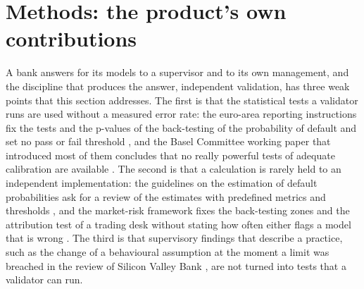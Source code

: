 \providecommand{\pxfn}[1]{\nolinkurl{#1}}

\section{Methods: the product's own contributions}
\label{sec:proposed}

A bank answers for its models to a supervisor and to its own management, and the discipline that produces the answer, independent
validation, has three weak points that this section addresses. The first is that the statistical tests a validator runs are used
without a measured error rate: the euro-area reporting instructions fix the tests and the p-values of the back-testing of the
probability of default and set no pass or fail threshold \citep{credit-scoring:ecb2019}, and the Basel Committee working paper that
introduced most of them concludes that no really powerful tests of adequate calibration are available \citep{credit-scoring:bcbswp14}. The second
is that a calculation is rarely held to an independent implementation: the guidelines on the estimation of default probabilities
ask for a review of the estimates with predefined metrics and thresholds \citep{validation-tests:eba2018gl1716}, and the market-risk framework
fixes the back-testing zones and the attribution test of a trading desk without stating how often either flags a model that is wrong
\citep{market:bcbsmar32}. The third is that supervisory findings that describe a practice, such as the change of a behavioural
assumption at the moment a limit was breached in the review of Silicon Valley Bank \citep{alm:fed2023}, are not turned into
tests that a validator can run.

